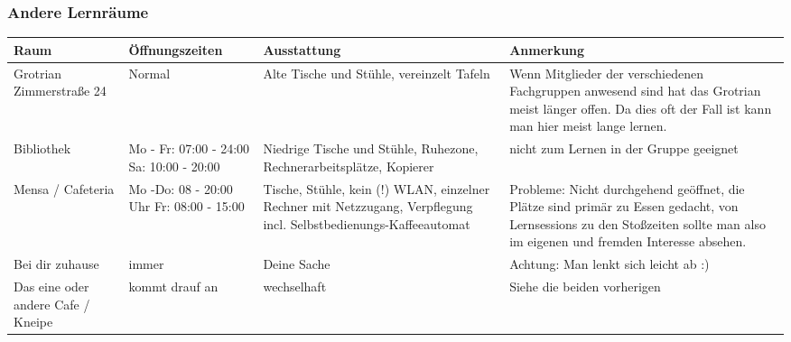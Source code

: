 	\subsubsection*{Andere Lernräume}
		\begin{tabular}{|p{4cm}|p{5cm}|p{3.6cm}|p{4cm}|}
 			\hline Raum & Öffnungszeiten & Ausstattung & Anmerkung  \\  
			\hline Grotrian  Zimmerstraße 24 & Normal  & Alte Tische und Stühle, vereinzelt Tafeln & Wenn Mitglieder der verschiedenen Fachgruppen anwesend sind hat das Grotrian meist länger offen. Da dies oft der Fall ist kann man hier meist lange lernen. \\ 
			\hline Bibliothek & Mo - Fr: 07:00 - 24:00 Sa: 10:00 - 20:00& Niedrige Tische und Stühle, Ruhezone, Rechnerarbeits\-plätze, Kopierer &  nicht zum  Lernen in der Gruppe  geeignet \\ 
			\hline Mensa / Cafeteria & Mo -Do: 08 - 20:00 Uhr Fr: 08:00 - 15:00 & Tische, Stühle, kein (!) WLAN, einzelner Rechner mit Netzzugang, Verpflegung incl. Selbstbedienungs-Kaffeeautomat& Probleme: Nicht durchgehend geöffnet, die Plätze sind primär zu Essen gedacht, von Lernsessions zu den Stoßzeiten sollte man also im eigenen und fremden Interesse absehen. \\ 
			\hline Bei dir zuhause & immer & Deine Sache & Achtung: Man lenkt sich leicht ab :) \\ 
			\hline Das eine oder andere Cafe / Kneipe & kommt drauf an & wechselhaft &Siehe die beiden vorherigen \\
			\hline
		\end{tabular}
